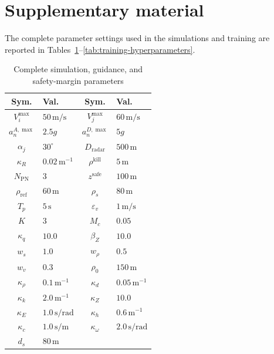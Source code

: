 \documentclass[unbranded]{cja}
\begin{document}
\appendix
\section{Supplementary material}
\label{app:complete-parameters}

The complete parameter settings used in the simulations and training are reported in Tables~\ref{tab:complete-simulation-parameters}--\ref{tab:training-hyperparameters}.

\begin{table}[!htbp]
\centering
\small
\setlength{\tabcolsep}{2.5pt}
\renewcommand{\arraystretch}{1.05}
\caption{Complete simulation, guidance, and safety-margin parameters}
\label{tab:complete-simulation-parameters}
\begin{tabularx}{\linewidth}{@{}c >{\centering\arraybackslash}X c >{\centering\arraybackslash}X@{}}
\toprule
Sym. & Val. & Sym. & Val. \\
\midrule
$V_i^{\max}$ & $50\,\mathrm{m/s}$ & $V_j^{\max}$ & $60\,\mathrm{m/s}$ \\
$a_n^{A,\max}$ & $2.5g$ & $a_n^{D,\max}$ & $5g$ \\
$\alpha_j$ & $30^{\circ}$ & $D_{\mathrm{radar}}$ & $500\,\mathrm{m}$ \\
$\kappa_R$ & $0.02\,\mathrm{m^{-1}}$ & $\rho^{\mathrm{kill}}$ & $5\,\mathrm{m}$ \\
$N_{\mathrm{PN}}$ & $3$ & $z^{\mathrm{safe}}$ & $100\,\mathrm{m}$ \\
$\rho_{\mathrm{ref}}$ & $60\,\mathrm{m}$ & $\rho_s$ & $80\,\mathrm{m}$ \\
$T_p$ & $5\,\mathrm{s}$ & $\varepsilon_v$ & $1\,\mathrm{m/s}$ \\
$K$ & $3$ & $M_c$ & $0.05$ \\
$\kappa_q$ & $10.0$ & $\beta_Z$ & $10.0$ \\
$w_s$ & $1.0$ & $w_{\rho}$ & $0.5$ \\
$w_v$ & $0.3$ & $\rho_0$ & $150\,\mathrm{m}$ \\
$\kappa_{\rho}$ & $0.1\,\mathrm{m^{-1}}$ & $\kappa_d$ & $0.05\,\mathrm{m^{-1}}$ \\
$\kappa_k$ & $2.0\,\mathrm{m^{-1}}$ & $\kappa_Z$ & $10.0$ \\
$\kappa_E$ & $1.0\,\mathrm{s/rad}$ & $\kappa_h$ & $0.6\,\mathrm{m^{-1}}$ \\
$\kappa_c$ & $1.0\,\mathrm{s/m}$ & $\kappa_{\omega}$ & $2.0\,\mathrm{s/rad}$ \\
$d_s$ & $80\,\mathrm{m}$ & & \\
\bottomrule
\end{tabularx}
\end{table}
\end{document}
